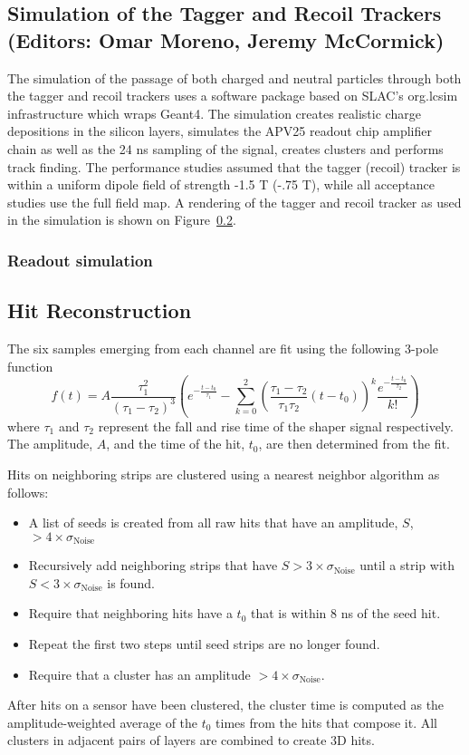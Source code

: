 
\subsection{Simulation of the Tagger and Recoil Trackers (Editors: Omar Moreno, Jeremy McCormick)}

The simulation of the passage of both charged and neutral particles through 
both the tagger and recoil trackers uses a software package based on SLAC's 
org.lcsim infrastructure which wraps Geant4.  The simulation creates realistic
charge depositions in the silicon layers, simulates the APV25 readout chip 
amplifier chain as well as the 24 ns sampling of the signal, creates clusters 
and performs track finding.  The performance studies assumed that the 
tagger (recoil) tracker is within a uniform dipole field of strength -1.5 T 
(-.75 T), while all acceptance studies use the full field map.  A rendering of
the tagger and recoil tracker as used in the simulation is shown on Figure~\ref{}.

\subsubsection{Readout simulation}


\subsection{Hit Reconstruction}

The six samples emerging from each channel are fit using the following 3-pole 
function
\begin{equation}
    f(t) = A\frac{\tau_1^2}{(\tau_1 - \tau_2)^3}\left( e^{-\frac{t-t_{0}}{\tau_1}}
        - \sum_{k=0}^2 \left(\frac{\tau_1 - \tau_2}{\tau_1\tau_2}(t-t_{0})\right)^k
        \frac{e^{-\frac{t-t_{0}}{\tau_2}}}{k!} \right)
\end{equation}
where $\tau_1$ and $\tau_2$ represent the fall and rise time of the shaper 
signal respectively.  The amplitude, $A$, and the time of the hit, $t_0$, are then
determined from the fit.

Hits on neighboring strips are clustered using a nearest neighbor
algorithm as follows: 
\begin{itemize}
    \item A list of seeds is created from all raw hits that have an amplitude, $S$,
          $> 4\times \sigma_{\text{Noise}}$
  \item Recursively add neighboring strips that have $S> 3 \times \sigma_{\text{Noise}}$
          until a strip with $S < 3\times \sigma_{\text{Noise}}$ is found.
      \item Require that neighboring hits have a $t_{0}$ that is within 8 ns of the seed hit.
    \item Repeat the first two steps until seed strips are no longer found.
\item Require that a cluster has an amplitude $> 4 \times \sigma_{\text{Noise}}$.
\end{itemize}
After hits on a sensor have been
clustered, the cluster time is computed as the amplitude-weighted average
of the $t_0$ times from the hits that compose it. All clusters in adjacent pairs
of layers are combined to create 3D hits.

